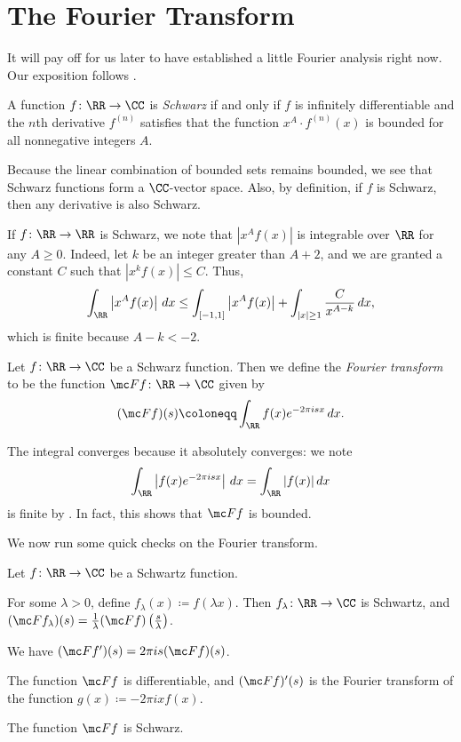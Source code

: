 \documentclass[notes.tex]{subfiles}
\begin{document}
\section{The Fourier Transform}
It will pay off for us later to have established a little Fourier analysis right now. Our exposition follows \cite[Chapter~5]{stein-fourier-analysis}.
\begin{definition}[Schwarz]
	A function $f\colon\RR\to\CC$ is \textit{Schwarz} if and only if $f$ is infinitely differentiable and the $n$th derivative $f^{(n)}$ satisfies that the function $x^A\cdot f^{(n)}(x)$ is bounded for all nonnegative integers $A$.
\end{definition}
\begin{remark} \label{rem:build-schwarz-functions}
	Because the linear combination of bounded sets remains bounded, we see that Schwarz functions form a $\CC$-vector space. Also, by definition, if $f$ is Schwarz, then any derivative is also Schwarz.
\end{remark}
\begin{remark} \label{rem:integrate-schwarz}
	If $f\colon\RR\to\RR$ is Schwarz, we note that $\left|x^Af(x)\right|$ is integrable over $\RR$ for any $A\ge0$. Indeed, let $k$ be an integer greater than $A+2$, and we are granted a constant $C$ such that $\left|x^kf(x)\right|\le C$. Thus,
	\[\int_\RR\left|x^Af(x)\right|\,dx\le\int_{[-1,1]}\left|x^Af(x)\right|+\int_{|x|\ge1}\frac C{x^{A-k}}\,dx,\]
	which is finite because $A-k<-2$.
\end{remark}
\begin{definition}
	Let $f\colon\RR\to\CC$ be a Schwarz function. Then we define the \textit{Fourier transform} to be the function $\mc Ff\colon\RR\to\CC$ given by
	\[(\mc Ff)(s)\coloneqq\int_\RR f(x)e^{-2\pi isx}\,dx.\]
\end{definition}
\begin{remark} \label{rem:fourier-transform-converges}
	The integral converges because it absolutely converges: we note
	\[\int_\RR\left|f(x)e^{-2\pi isx}\right|\,dx=\int_\RR|f(x)|\,dx\]
	is finite by . In fact, this shows that $\mc Ff$ is bounded.
\end{remark}
We now run some quick checks on the Fourier transform.
\begin{lemma} \label{lem:fourier-checks}
	Let $f\colon\RR\to\CC$ be a Schwartz function.
	\begin{listalph}
		\item For some $\lambda>0$, define $f_\lambda(x)\coloneqq f(\lambda x)$. Then $f_\lambda\colon\RR\to\CC$ is Schwartz, and $(\mc Ff_\lambda)(s)=\frac1\lambda(\mc Ff)\left(\frac s\lambda\right)$.
		\item We have $(\mc Ff')(s)=2\pi is(\mc Ff)(s)$.
		\item The function $\mc Ff$ is differentiable, and $(\mc Ff)'(s)$ is the Fourier transform of the function $g(x)\coloneqq-2\pi ixf(x)$.
		\item The function $\mc Ff$ is Schwarz.
	\end{listalph}
\end{lemma}
\end{document}
